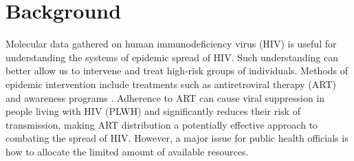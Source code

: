 \documentclass[twocolumn]{bmcart}%
\begin{document}

%

\section*{Background}
Molecular data gathered on human immunodeficiency virus (HIV) is useful for understanding the systems of epidemic spread of HIV. Such understanding can better allow us to intervene and treat high-risk groups of individuals. Methods of epidemic intervention include treatments such as antiretroviral therapy (ART) and awareness programs \cite{cdc2}. Adherence to ART can cause viral suppression in people living with HIV (PLWH) and significantly reduces their risk of transmission, making ART distribution a potentially effective approach to combating the spread of HIV. However, a major issue for public health officials is how to allocate the limited amount of available resources. 
\end{document}
